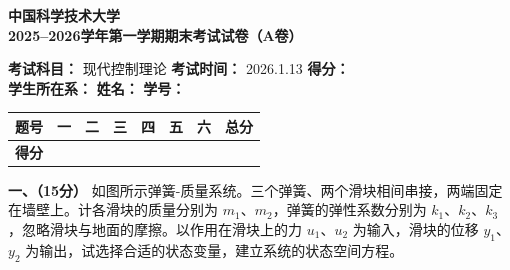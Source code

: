 \documentclass[11pt,a4paper]{ctexart}
\begin{document}
\begin{center}
    {\LARGE\bfseries 中国科学技术大学} \\[0.6em]
    {\Large\bfseries 2025--2026学年第一学期期末考试试卷（A卷）}
\end{center}

\vspace{1em}

\noindent
\textbf{考试科目：} 现代控制理论 \hfill \textbf{考试时间：} 2026.1.13 \hfill \textbf{得分：} \underline{\hspace{2cm}} \\
\textbf{学生所在系：} \underline{\hspace{3.5cm}} \hfill \textbf{姓名：} \underline{\hspace{3.5cm}} \hfill \textbf{学号：} \underline{\hspace{4.5cm}}

\vspace{1.5em}

\noindent
\begin{table}[h]
\centering
\small
\def\arraystretch{1.5}
\begin{tabular}{|c|p{1.2cm}|p{1.2cm}|p{1.2cm}|p{1.2cm}|p{1.2cm}|p{1.2cm}|p{1.5cm}|}
\hline
\textbf{题号} & \hfil \textbf{一} & \hfil \textbf{二} & \hfil \textbf{三} & \hfil \textbf{四} & \hfil \textbf{五} & \hfil \textbf{六} & \hfil \textbf{总分} \\ \hline
\textbf{得分} & & & & & & & \\ \hline
\end{tabular}
\end{table}

\vspace{1.5em}

\noindent
\textbf{一、（15分）} 如图所示弹簧-质量系统。三个弹簧、两个滑块相间串接，两端固定在墙壁上。计各滑块的质量分别为 $m_1$、$m_2$，弹簧的弹性系数分别为 $k_1$、$k_2$、$k_3$，忽略滑块与地面的摩擦。以作用在滑块上的力 $u_1$、$u_2$ 为输入，滑块的位移 $y_1$、$y_2$ 为输出，试选择合适的状态变量，建立系统的状态空间方程。
\end{document}
